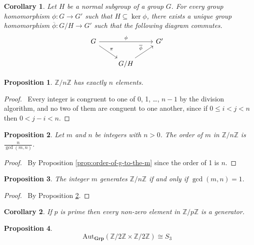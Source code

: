 \documentclass{book}
\let\qed\relax
\newtheorem{prop}{Proposition}[chapter]
\newtheorem{cor}{Corollary}[prop]
\theoremstyle{definition}
\newcommand{\Aut}[2]{\ensuremath{\mathrm{Aut}_{#1} \left( {#2} \right)}}
\newcommand{\Grp}{\ensuremath{\mathbf{Grp}}}
\begin{document}
\begin{cor}
Let $H$ be a normal subgroup of a group $G$. For every group homomorphism $\phi : G \rightarrow G'$ such that $H \subseteq \ker \phi$, there exists a unique group homomorphism $\overline{\phi} : G / H \rightarrow G'$ such that the following diagram commutes.
\[ \begin{tikzcd}
G \arrow[rr,"\phi"]  \arrow[dr,"\pi"] & & G' \\
& G/ H\arrow[ur,"\overline{\phi}"]
\end{tikzcd} \]
\end{cor}

\begin{prop}
    $\mathbb{Z} / n \mathbb{Z}$ has exactly $n$ elements.
\end{prop}

\begin{proof}
    \pf\ Every integer is congruent to one of 0, 1, \ldots, $n - 1$ by the division algorithm, and no two of them are conguent to one another, since if $0 \leq i < j < n$ then $0 < j - i < n$. \qed
\end{proof}

\begin{prop}
    \label{prop:order-of-m-in-ZnZ}
    Let $m$ and $n$ be integers with $n > 0$. The order of $m$ in $\mathbb{Z} / n \mathbb{Z}$ is $\frac{n}{\gcd(m,n)}$.
\end{prop}

\begin{proof}
    \pf\ By Proposition \ref{prop:order-of-g-to-the-m} since the order of 1 is $n$. \qed
\end{proof}

\begin{prop}
    The integer $m$ generates $\mathbb{Z} / n \mathbb{Z}$ if and only if $\gcd(m,n) = 1$.
\end{prop}

\begin{proof}
    \pf\ By Proposition \ref{prop:order-of-m-in-ZnZ}. \qed
\end{proof}

\begin{cor}
    If $p$ is prime then every non-zero element in $\mathbb{Z} / p \mathbb{Z}$ is a generator.
\end{cor}

\begin{prop}
    \[ \Aut{\Grp}{\mathbb{Z} / 2 \mathbb{Z} \times \mathbb{Z} / 2 \mathbb{Z}} \cong S_3 \]
\end{prop}
\end{document}
